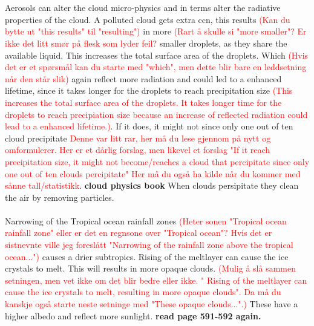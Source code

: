 \\ \\
Aerosols can alter the cloud micro-physics and in terms alter the radiative properties of the cloud. A polluted cloud gets extra \acrshort{ccn}, this results \textcolor{red}{(Kan du bytte ut "this results" til "resulting")} in more \textcolor{red}{(Rart å skulle si "more smaller"? Er ikke det litt smør på flesk som lyder feil?} smaller droplets, as they share the available liquid. This increases the total surface area of the droplets. Which \textcolor{red}{(Hvis det er et spørsmål kan du starte med "which", men dette blir bare en leddsetning når den står slik)} again reflect more radiation and could led to a enhanced lifetime, since it takes longer for the droplets to reach precipitation size \textcolor{red}{(This increases the total surface area of the droplets. It takes longer time for the droplets to reach precipiation size because an increase of reflected radiation could le\textcolor{red}{a}d to a enhanced lifetime.)}. If it does, it might not since only one out of ten cloud precipitate \textcolor{red}{Denne var litt rar, her må du lese gjennom på nytt og omformulerer. Her er et dårlig forslag, men likevel et forslag "If it reach precipitation size, it might not become/reaches a cloud that percipitate since only one out of ten clouds percipitate" Her må du også ha kilde når du kommer med sånne tall/statistikk}. \textbf{cloud physics book} When clouds persipitate they clean the air by removing particles.
\\ \\ 
Narrowing of the Tropical ocean rainfall zones \textcolor{red}{(Heter sonen "Tropical ocean rainfall zone" eller er det en regnsone over "Tropical ocean"? Hvis det er sistnevnte ville jeg foreslått "Narrowing of the rainfall zone above the tropical ocean...")} causes a drier subtropics. Rising of the meltlayer can cause the ice crystals to melt. This will results in more opaque clouds. \textcolor{red}{(Mulig å slå sammen setningen, men vet ikke om det blir bedre eller ikke. " Rising of the meltlayer can cause the ice crystals to melt, resulting in more opaque clouds". Da må du kanskje også starte neste setninge med "These opaque clouds...".)} These have a higher albedo and reflect more sunlight. \textbf{read page 591-592 again.}
\\ \\
